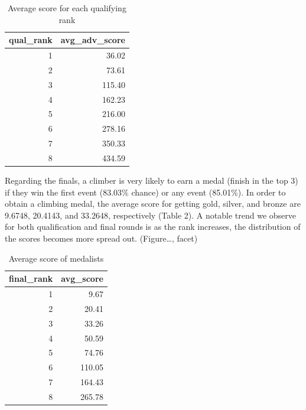 \documentclass[12pt]{article}
\begin{document}
\begin{table}[ht]
\centering
\caption{Average score for each qualifying rank} 
\begin{tabular}{rr}
  \hline
qual\_rank & avg\_adv\_score \\ 
  \hline
  1 & 36.02 \\ 
    2 & 73.61 \\ 
    3 & 115.40 \\ 
    4 & 162.23 \\ 
    5 & 216.00 \\ 
    6 & 278.16 \\ 
    7 & 350.33 \\ 
    8 & 434.59 \\ 
   \hline
\end{tabular}
\end{table}

Regarding the finals, a climber is very likely to earn a medal (finish
in the top 3) if they win the first event (83.03\% chance) or any event
(85.01\%). In order to obtain a climbing medal, the average score for
getting gold, silver, and bronze are 9.6748, 20.4143, and 33.2648,
respectively (Table 2). A notable trend we observe for both
qualification and final rounds is as the rank increases, the
distribution of the scores becomes more spread out. (Figure\ldots,
facet)

\begin{table}[ht]
\centering
\caption{Average score of medalists} 
\begin{tabular}{rr}
  \hline
final\_rank & avg\_score \\ 
  \hline
  1 & 9.67 \\ 
    2 & 20.41 \\ 
    3 & 33.26 \\ 
    4 & 50.59 \\ 
    5 & 74.76 \\ 
    6 & 110.05 \\ 
    7 & 164.43 \\ 
    8 & 265.78 \\ 
   \hline
\end{tabular}
\end{table}
\end{document}
